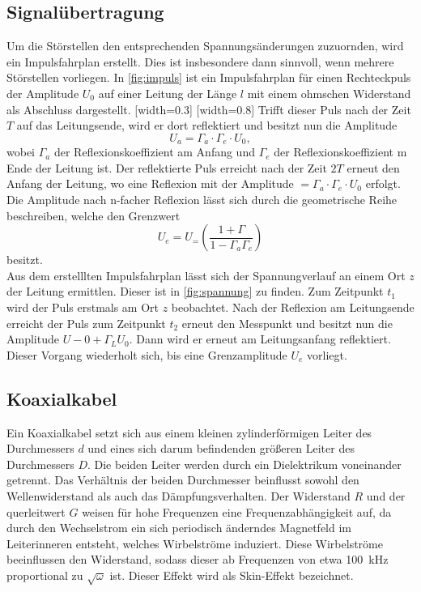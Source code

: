 \subsection{Signalübertragung}
Um die Störstellen den entsprechenden Spannungsänderungen zuzuornden, wird ein Impulsfahrplan erstellt. Dies ist insbesondere dann sinnvoll, wenn mehrere Störstellen vorliegen. In \autoref{fig:impuls} ist ein Impulsfahrplan für einen Rechteckpuls der Amplitude $U_0$ auf einer Leitung der Länge $l$ mit einem ohmschen Widerstand als Abschluss dargestellt.
[width=0.3\textwidth]
[width=0.8\textwidth]
Trifft dieser Puls nach der Zeit $T$ auf das Leitungsende, wird er dort reflektiert und besitzt nun die Amplitude
\begin{equation}
  U_a=\Gamma_a \cdot \Gamma_e \cdot U_0,
\end{equation}
wobei $\Gamma_a$ der Reflexionskoeffizient am Anfang und $\Gamma_e$ der Reflexionskoeffizient m Ende der Leitung ist. Der reflektierte Puls erreicht nach der Zeit $2T$ erneut den Anfang der Leitung, wo eine Reflexion mit der Amplitude $=\Gamma_a \cdot \Gamma_e \cdot U_0$ erfolgt. Die Amplitude nach n-facher Reflexion lässt sich durch die geometrische Reihe beschreiben, welche den Grenzwert
\begin{equation}
  U_e=U_=\left(\frac{1+\Gamma}{1-\Gamma_a \Gamma_e}\right)
\end{equation}
besitzt.\\
Aus dem erstelllten Impulsfahrplan lässt sich der Spannungverlauf an einem Ort $z$ der Leitung ermittlen. Dieser ist in \autoref{fig:spannung} zu finden. Zum Zeitpunkt $t_1$ wird der Puls erstmals am Ort $z$ beobachtet. Nach der Reflexion am Leitungsende erreicht der Puls zum Zeitpunkt $t_2$ erneut den Messpunkt und besitzt nun die Amplitude $U-0 +\Gamma_L U_0$. Dann wird er erneut am Leitungsanfang reflektiert. Dieser Vorgang wiederholt sich, bis eine Grenzamplitude $U_e$ vorliegt.

\subsection{Koaxialkabel}
Ein Koaxialkabel setzt sich aus einem kleinen zylinderförmigen Leiter des Durchmessers $d$ und eines sich darum befindenden größeren Leiter des Durchmessers $D$. Die beiden Leiter werden durch ein Dielektrikum voneinander getrennt. Das Verhältnis der beiden Durchmesser beinflusst sowohl den Wellenwiderstand als auch das Dämpfungsverhalten. Der Widerstand $R$ und der querleitwert $G$ weisen für hohe Frequenzen eine Frequenzabhängigkeit auf, da durch den Wechselstrom ein sich periodisch änderndes Magnetfeld im Leiterinneren entsteht, welches Wirbelströme induziert. Diese Wirbelströme beeinflussen den Widerstand, sodass dieser ab Frequenzen von etwa \SI{100}{\kilo\hertz} proportional zu $\sqrt{\omega}$ ist. Dieser Effekt wird als Skin-Effekt bezeichnet.

